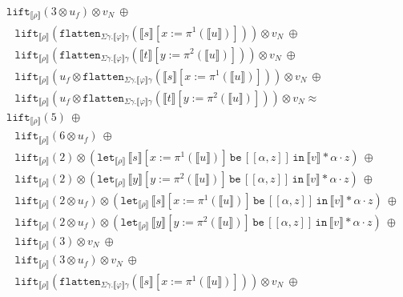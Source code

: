 \documentclass[runningheads,a4paper]{llncs}
\newcommand{\typeinterpret}[1]{\llbracket #1 \rrbracket}
\newcommand{\interpret}[1]{\llbracket #1 \rrbracket}
\newcommand{\expair}[2]{[#1,#2]}
\newcommand{\flatten}{\mathtt{flatten}}
\newcommand{\lift}{\mathtt{lift}}
\newcommand{\xlet}[4]{\mathtt{let}_{#1}\,#2\,\mathtt{be}\,[#3]\,\mathtt{in}\,#4}
\begin{document}
\begin{itemize}
\[\begin{array}{l}
  \lift_{\typeinterpret{\rho}}(3 \otimes u_f) \otimes v_N\ \oplus \\
  \phantom{A}
  \lift_{\typeinterpret{\rho}}(\flatten_{\Sigma\gamma.\typeinterpret{
    \varphi}\gamma}(\interpret{s}[x:=\pi^1(\interpret{u})]))
    \otimes v_N\ \oplus \\
  \phantom{A}
  \lift_{\typeinterpret{\rho}}(\flatten_{\Sigma\gamma.\typeinterpret{
    \varphi}\gamma}(\interpret{t}[y:=\pi^2(\interpret{u})]))
    \otimes v_N\ \oplus \\
  \phantom{A}
  \lift_{\typeinterpret{\rho}}(u_f \otimes
    \flatten_{\Sigma\gamma.\typeinterpret{\varphi}\gamma}(
    \interpret{s}[x:=\pi^1(\interpret{u})]))
    \otimes v_N\ \oplus \\
  \phantom{A} \lift_{\typeinterpret{\rho}}(u_f \otimes
    \flatten_{\Sigma\gamma.\typeinterpret{
    \varphi}\gamma}(\interpret{t}[y:=\pi^2(\interpret{u})])) \otimes
    v_N \approx \\
  \lift_{\interpret{\rho}}(5)\ \oplus \\
  \phantom{A}
  \lift_{\typeinterpret{\rho}}(6 \otimes u_f)\ \oplus \\
  \phantom{A}
  \lift_{\interpret{\rho}}(2) \otimes
    (\xlet{\typeinterpret{\rho}}{\interpret{s}[x:=\pi^1(
    \interpret{u})]}{\expair{\alpha}{z}}{\interpret{v} * \alpha
    \cdot z})\ \oplus \\
  \phantom{A}
  \lift_{\interpret{\rho}}(2) \otimes
    (\xlet{\typeinterpret{\rho}}{\interpret{y}[y:=\pi^2(
    \interpret{u})]}{\expair{\alpha}{z}}{\interpret{v} * \alpha
    \cdot z})\ \oplus \\
  \phantom{A}
  \lift_{\interpret{\rho}}(2 \otimes u_f) \otimes
    (\xlet{\typeinterpret{\rho}}{\interpret{s}[x:=\pi^1(
    \interpret{u})]}{\expair{\alpha}{z}}{\interpret{v} * \alpha
    \cdot z})\ \oplus \\
  \phantom{A}
  \lift_{\interpret{\rho}}(2 \otimes u_f) \otimes
    (\xlet{\typeinterpret{\rho}}{\interpret{y}[y:=\pi^2(
    \interpret{u})]}{\expair{\alpha}{z}}{\interpret{v} * \alpha
    \cdot z})\ \oplus \\
  \phantom{A}
  \lift_{\typeinterpret{\rho}}(3) \otimes v_N\ \oplus \\
  \phantom{A}
  \lift_{\typeinterpret{\rho}}(3 \otimes u_f) \otimes v_N\ \oplus \\
  \phantom{A}
  \lift_{\typeinterpret{\rho}}(\flatten_{\Sigma\gamma.\typeinterpret{
    \varphi}\gamma}(\interpret{s}[x:=\pi^1(\interpret{u})]))
    \otimes v_N\ \oplus \\

\end{array}\]
\end{itemize}
\end{document}
